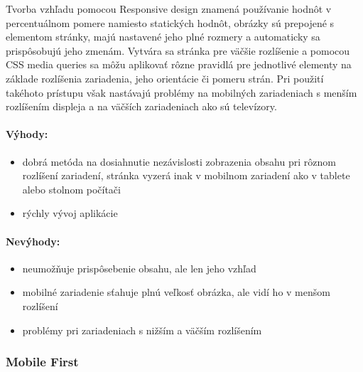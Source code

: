 Tvorba vzhľadu pomocou Responsive design znamená používanie hodnôt v percentuálnom pomere namiesto statických hodnôt, obrázky sú prepojené s elementom stránky, majú nastavené jeho plné rozmery a automaticky sa prispôsobujú jeho zmenám. Vytvára sa stránka pre väčšie rozlíšenie a pomocou CSS media queries sa môžu aplikovať rôzne pravidlá pre jednotlivé elementy na základe rozlíšenia zariadenia, jeho orientácie či pomeru strán. Pri použití takéhoto prístupu však nastávajú problémy na mobilných zariadeniach s menším rozlíšením displeja a na väčších zariadeniach ako sú televízory.\\



\paragraph{Výhody:}
\begin{itemize}
	\item dobrá metóda na dosiahnutie nezávislosti zobrazenia obsahu pri rôznom rozlíšení zariadení, stránka vyzerá inak v mobilnom zariadení ako v tablete alebo stolnom počítači
	\item rýchly vývoj aplikácie
\end{itemize}

\paragraph{Nevýhody:}
\begin{itemize}
	\item neumožňuje prispôsebenie obsahu, ale len jeho vzhľad
	\item mobilné zariadenie sťahuje plnú veľkosť obrázka, ale vidí ho v menšom rozlíšení
	\item problémy pri zariadeniach s nižším a väčším rozlíšením
\end{itemize}



\subsubsection{Mobile First} %
\label{ssub:mobile_first_responsive_design}

